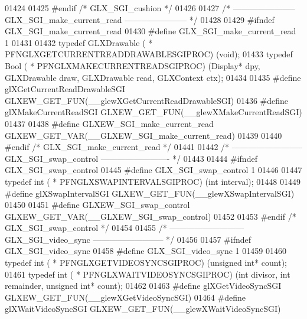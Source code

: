 \begin{DoxyCode}
01424 
01425 \textcolor{preprocessor}{#endif }\textcolor{comment}{/* GLX\_SGI\_cushion */}\textcolor{preprocessor}{}
01426 
01427 \textcolor{comment}{/* ----------------------- GLX\_SGI\_make\_current\_read ----------------------- */}
01428 
01429 \textcolor{preprocessor}{#ifndef GLX\_SGI\_make\_current\_read}
01430 \textcolor{preprocessor}{#define GLX\_SGI\_make\_current\_read 1}
01431 
01432 \textcolor{keyword}{typedef} GLXDrawable ( * PFNGLXGETCURRENTREADDRAWABLESGIPROC) (void);
01433 \textcolor{keyword}{typedef} Bool ( * PFNGLXMAKECURRENTREADSGIPROC) (Display* dpy, GLXDrawable draw, GLXDrawable 
      read, GLXContext ctx);
01434 
01435 \textcolor{preprocessor}{#define glXGetCurrentReadDrawableSGI GLXEW\_GET\_FUN(\_\_glewXGetCurrentReadDrawableSGI)}
01436 \textcolor{preprocessor}{#define glXMakeCurrentReadSGI GLXEW\_GET\_FUN(\_\_glewXMakeCurrentReadSGI)}
01437 
01438 \textcolor{preprocessor}{#define GLXEW\_SGI\_make\_current\_read GLXEW\_GET\_VAR(\_\_GLXEW\_SGI\_make\_current\_read)}
01439 
01440 \textcolor{preprocessor}{#endif }\textcolor{comment}{/* GLX\_SGI\_make\_current\_read */}\textcolor{preprocessor}{}
01441 
01442 \textcolor{comment}{/* -------------------------- GLX\_SGI\_swap\_control ------------------------- */}
01443 
01444 \textcolor{preprocessor}{#ifndef GLX\_SGI\_swap\_control}
01445 \textcolor{preprocessor}{#define GLX\_SGI\_swap\_control 1}
01446 
01447 \textcolor{keyword}{typedef} int ( * PFNGLXSWAPINTERVALSGIPROC) (\textcolor{keywordtype}{int} interval);
01448 
01449 \textcolor{preprocessor}{#define glXSwapIntervalSGI GLXEW\_GET\_FUN(\_\_glewXSwapIntervalSGI)}
01450 
01451 \textcolor{preprocessor}{#define GLXEW\_SGI\_swap\_control GLXEW\_GET\_VAR(\_\_GLXEW\_SGI\_swap\_control)}
01452 
01453 \textcolor{preprocessor}{#endif }\textcolor{comment}{/* GLX\_SGI\_swap\_control */}\textcolor{preprocessor}{}
01454 
01455 \textcolor{comment}{/* --------------------------- GLX\_SGI\_video\_sync -------------------------- */}
01456 
01457 \textcolor{preprocessor}{#ifndef GLX\_SGI\_video\_sync}
01458 \textcolor{preprocessor}{#define GLX\_SGI\_video\_sync 1}
01459 
01460 \textcolor{keyword}{typedef} int ( * PFNGLXGETVIDEOSYNCSGIPROC) (\textcolor{keywordtype}{unsigned} \textcolor{keywordtype}{int}* count);
01461 \textcolor{keyword}{typedef} int ( * PFNGLXWAITVIDEOSYNCSGIPROC) (\textcolor{keywordtype}{int} divisor, \textcolor{keywordtype}{int} remainder, \textcolor{keywordtype}{unsigned} \textcolor{keywordtype}{int}* 
      count);
01462 
01463 \textcolor{preprocessor}{#define glXGetVideoSyncSGI GLXEW\_GET\_FUN(\_\_glewXGetVideoSyncSGI)}
01464 \textcolor{preprocessor}{#define glXWaitVideoSyncSGI GLXEW\_GET\_FUN(\_\_glewXWaitVideoSyncSGI)}

\end{DoxyCode}
